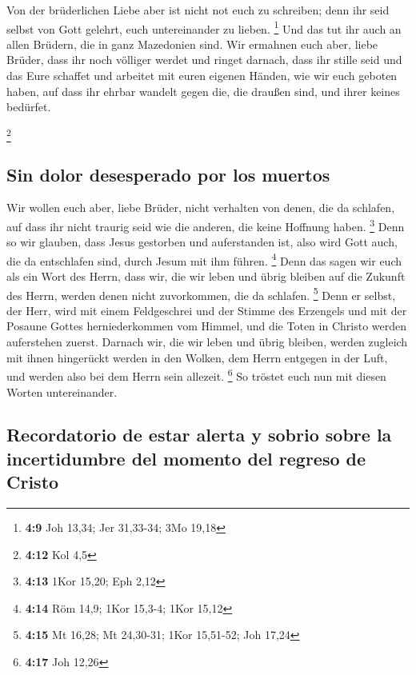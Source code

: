  Von der brüderlichen Liebe aber ist nicht not euch zu
schreiben; denn ihr seid selbst von Gott gelehrt, euch untereinander zu
lieben. \footnote{\textbf{4:9} Joh 13,34; Jer 31,33-34; 3Mo 19,18}
 Und das tut ihr auch an allen Brüdern, die in ganz
Mazedonien sind. Wir ermahnen euch aber, liebe Brüder, dass ihr noch
völliger werdet  und ringet darnach, dass ihr stille seid
und das Eure schaffet und arbeitet mit euren eigenen Händen, wie wir
euch geboten haben,  auf dass ihr ehrbar wandelt gegen
die, die draußen sind, und ihrer keines bedürfet.

\footnote{\textbf{4:12} Kol 4,5}

\hypertarget{sin-dolor-desesperado-por-los-muertos}{%
\subsection{Sin dolor desesperado por los
muertos}\label{sin-dolor-desesperado-por-los-muertos}}

 Wir wollen euch aber, liebe Brüder, nicht verhalten von
denen, die da schlafen, auf dass ihr nicht traurig seid wie die anderen,
die keine Hoffnung haben. \footnote{\textbf{4:13} 1Kor 15,20; Eph 2,12}
 Denn so wir glauben, dass Jesus gestorben und
auferstanden ist, also wird Gott auch, die da entschlafen sind, durch
Jesum mit ihm führen. \footnote{\textbf{4:14} Röm 14,9; 1Kor 15,3-4;
  1Kor 15,12}  Denn das sagen wir euch als ein Wort des
Herrn, dass wir, die wir leben und übrig bleiben auf die Zukunft des
Herrn, werden denen nicht zuvorkommen, die da schlafen. \footnote{\textbf{4:15}
  Mt 16,28; Mt 24,30-31; 1Kor 15,51-52; Joh 17,24}  Denn
er selbst, der Herr, wird mit einem Feldgeschrei und der Stimme des
Erzengels und mit der Posaune Gottes herniederkommen vom Himmel, und die
Toten in Christo werden auferstehen zuerst.  Darnach wir,
die wir leben und übrig bleiben, werden zugleich mit ihnen hingerückt
werden in den Wolken, dem Herrn entgegen in der Luft, und werden also
bei dem Herrn sein allezeit. \footnote{\textbf{4:17} Joh 12,26}
 So tröstet euch nun mit diesen Worten untereinander.

\hypertarget{recordatorio-de-estar-alerta-y-sobrio-sobre-la-incertidumbre-del-momento-del-regreso-de-cristo}{%
\subsection{Recordatorio de estar alerta y sobrio sobre la incertidumbre
del momento del regreso de
Cristo}\label{recordatorio-de-estar-alerta-y-sobrio-sobre-la-incertidumbre-del-momento-del-regreso-de-cristo}}


